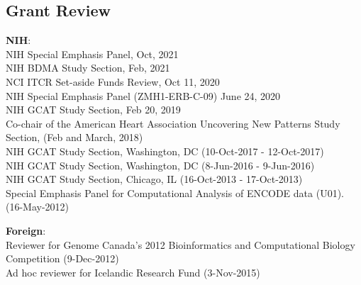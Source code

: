 \documentclass[margin,line]{cv}
\begin{document}
\begin{resume}
    \section{\mysidestyle Grant Review}
    \textbf{NIH}:\\
    NIH Special Emphasis Panel, Oct, 2021\\
    NIH BDMA Study Section, Feb, 2021\\
    NCI ITCR Set-aside Funds Review, Oct 11, 2020\\
    NIH Special Emphasis Panel (ZMH1-ERB-C-09) June 24, 2020\\
    NIH GCAT Study Section, Feb 20, 2019\\
    Co-chair of the American Heart Association Uncovering New Patterns Study Section, (Feb and March, 2018)\\
    NIH GCAT Study Section, Washington, DC (10-Oct-2017 - 12-Oct-2017)\\
    NIH GCAT Study Section, Washington, DC (8-Jun-2016 - 9-Jun-2016)\\
    NIH GCAT Study Section, Chicago, IL (16-Oct-2013 - 17-Oct-2013)\\
    Special Emphasis Panel for Computational Analysis of ENCODE data (U01). (16-May-2012)

    \textbf{Foreign}:\\
    Reviewer for Genome Canada's 2012 Bioinformatics and Computational Biology Competition (9-Dec-2012)\\
    Ad hoc reviewer for Icelandic Research Fund (3-Nov-2015)



\end{resume}
\end{document}
